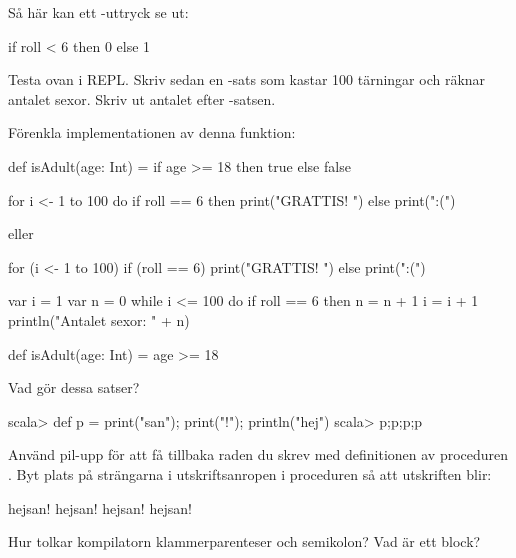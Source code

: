 \Subtask Så här kan ett -uttryck se ut:
\begin{Code}
if roll < 6 then 0 else 1
\end{Code}
Testa ovan i REPL. Skriv sedan en -sats som kastar 100 tärningar och räknar antalet sexor. Skriv ut antalet efter -satsen.

\Subtask Förenkla implementationen av denna funktion:
\begin{Code}
def isAdult(age: Int) = if age >= 18 then true else false
\end{Code}
  

\SOLUTION

\TaskSolved \what

\SubtaskSolved
\begin{Code}
for i <- 1 to 100 do 
  if roll == 6 then print("GRATTIS! ") else print(":(")
\end{Code}
eller
\begin{Code}
for (i <- 1 to 100) if (roll == 6) print("GRATTIS! ") else print(":(")
\end{Code}

\SubtaskSolved
\begin{Code}
var i = 1
var n = 0
while i <= 100 do
  if roll == 6 then n = n + 1
  i = i + 1
println("Antalet sexor: " + n)
\end{Code}

\SubtaskSolved
\begin{Code}
def isAdult(age: Int) = age >= 18
\end{Code}


\QUESTEND




\QUESTBEGIN

\Task \what

\Subtask Vad gör dessa satser?
\begin{REPLnonum}
scala> def p = { print("san"); print("!"); println("hej")}
scala> p;p;p;p
\end{REPLnonum}

\Subtask
Använd pil-upp för att få tillbaka raden du skrev med definitionen av proceduren . Byt plats på strängarna i utskriftsanropen i proceduren  så att utskriften blir:
\begin{REPLnonum}
hejsan!
hejsan!
hejsan!
hejsan!
\end{REPLnonum}

\Subtask Hur tolkar kompilatorn klammerparenteser och semikolon? Vad är ett block?

